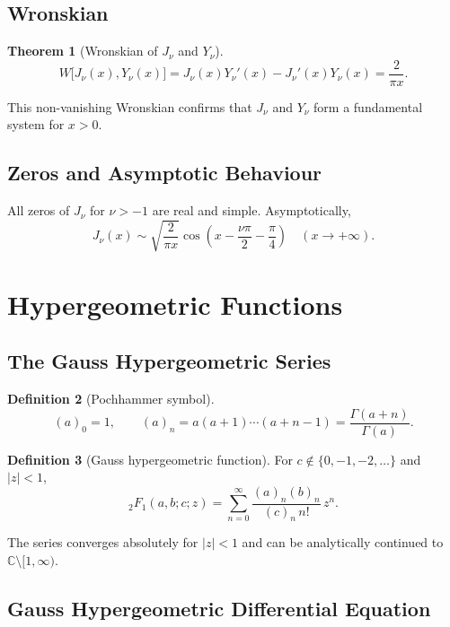 \documentclass[12pt,a4paper]{amsart}
\newtheorem{theorem}{Theorem}[section]
\theoremstyle{definition}
\newtheorem{definition}[theorem]{Definition}
\begin{document}
\subsection{Wronskian}

\begin{theorem}[Wronskian of \(J_\nu\) and \(Y_\nu\)]
\[
  W\bigl[J_\nu(x), Y_\nu(x)\bigr]
  = J_\nu(x)Y_\nu'(x) - J_\nu'(x)Y_\nu(x)
  = \frac{2}{\pi x}.
\]
\end{theorem}

This non-vanishing Wronskian confirms that \(J_\nu\) and \(Y_\nu\) form a fundamental
system for \(x > 0\).

\subsection{Zeros and Asymptotic Behaviour}

All zeros of \(J_\nu\) for \(\nu > -1\) are real and simple.  Asymptotically,
\[
  J_\nu(x) \sim \sqrt{\frac{2}{\pi x}}\cos\!\left(x - \frac{\nu\pi}{2} - \frac{\pi}{4}\right)
  \quad (x \to +\infty).
\]

\section{Hypergeometric Functions}
\label{sec:hypergeometric}

\subsection{The Gauss Hypergeometric Series}

\begin{definition}[Pochhammer symbol]
\[
  (a)_0 = 1, \qquad (a)_n = a(a+1)\cdots(a+n-1) = \frac{\Gamma(a+n)}{\Gamma(a)}.
\]
\end{definition}

\begin{definition}[Gauss hypergeometric function]\label{def:2F1}
For \(c \notin \{0,-1,-2,\ldots\}\) and \(|z| < 1\),
\[
  {}_2F_1(a,b;c;z)
  = \sum_{n=0}^\infty \frac{(a)_n(b)_n}{(c)_n\,n!}\,z^n.
\]
\end{definition}

The series converges absolutely for \(|z| < 1\) and can be analytically continued to
\(\mathbb{C}\setminus[1,\infty)\).

\subsection{Gauss Hypergeometric Differential Equation}
\end{document}
